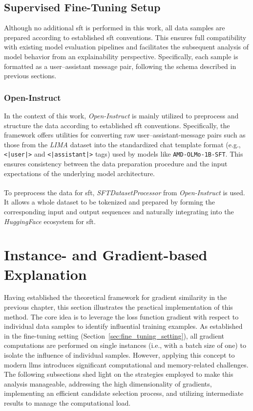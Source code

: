 \subsection{Supervised Fine-Tuning Setup}
Although no additional \acrfull{sft} is performed in this work, all data samples are prepared according to established \acrshort{sft} conventions. This ensures full compatibility with existing model evaluation pipelines and facilitates the subsequent analysis of model behavior from an explainability perspective. Specifically, each sample is formatted as a user–assistant message pair, following the schema described in previous sections.

\subsubsection{Open-Instruct}
In the context of this work, \emph{Open-Instruct} is mainly utilized to preprocess and structure the data according to established \acrshort{sft} conventions. Specifically, the framework offers utilities for converting raw user–assistant-message pairs such as those from the \emph{LIMA} dataset into the standardized chat template format (e.g., \texttt{<|user|>} and \texttt{<|assistant|>} tags) used by models like \texttt{AMD-OLMo-1B-SFT}. This ensures consistency between the data preparation procedure and the input expectations of the underlying model architecture.
\\\\
To preprocess the data for \acrfull{sft}, \emph{SFTDatasetProcessor} from \emph{Open-Instruct} is used. It allows a whole dataset to be tokenized and prepared by forming the corresponding input and output sequences and naturally integrating into the \emph{HuggingFace} ecosystem for \acrshort{sft}.

\section{Instance- and Gradient-based Explanation}
Having established the theoretical framework for gradient similarity in the previous chapter, this section illustrates the practical implementation of this method. The core idea is to leverage the loss function gradient with respect to individual data samples to identify influential training examples. As established in the fine-tuning setting (Section~\ref{sec:fine_tuning_setting}), all gradient computations are performed on single instances (i.e., with a batch size of one) to isolate the influence of individual samples. However, applying this concept to modern \acrlong{llm}s introduces significant computational and memory-related challenges. The following subsections shed light on the strategies employed to make this analysis manageable, addressing the high dimensionality of gradients, implementing an efficient candidate selection process, and utilizing intermediate results to manage the computational load.

